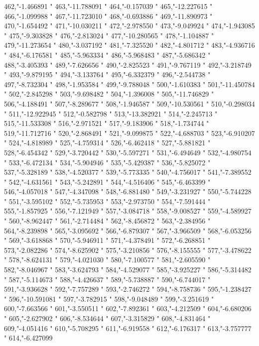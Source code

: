 462,"-1.466891
"
463,"-11.788091
"
464,"-0.157039
"
465,"-12.227615
"
466,"-1.099988
"
467,"-11.723010
"
468,"-0.693886
"
469,"-11.890973
"
470,"-1.654492
"
471,"-10.030211
"
472,"-2.978550
"
473,"-9.049924
"
474,"-1.943085
"
475,"-9.303828
"
476,"-2.813024
"
477,"-10.280565
"
478,"-1.104887
"
479,"-11.273654
"
480,"-3.037192
"
481,"-7.325520
"
482,"-4.801712
"
483,"-4.936716
"
484,"-6.176581
"
485,"-5.963334
"
486,"-5.968483
"
487,"-5.686342
"
488,"-3.405393
"
489,"-7.626656
"
490,"-2.825523
"
491,"-9.767119
"
492,"-3.218749
"
493,"-9.879195
"
494,"-3.133764
"
495,"-6.332379
"
496,"-2.544738
"
497,"-8.732304
"
498,"-1.953584
"
499,"-9.788048
"
500,"-1.610383
"
501,"-11.450784
"
502,"-2.845298
"
503,"-9.698482
"
504,"-1.396008
"
505,"-11.746829
"
506,"-4.188491
"
507,"-8.289677
"
508,"-1.946587
"
509,"-10.530561
"
510,"-0.298034
"
511,"-12.922945
"
512,"-0.582798
"
513,"-13.382921
"
514,"-2.245713
"
515,"-11.533308
"
516,"-2.971521
"
517,"-9.183906
"
518,"-1.734744
"
519,"-11.712716
"
520,"-2.868491
"
521,"-9.099875
"
522,"-4.688703
"
523,"-6.910207
"
524,"-4.818989
"
525,"-4.759314
"
526,"-6.462418
"
527,"-5.881821
"
528,"-6.454342
"
529,"-3.720442
"
530,"-5.597271
"
531,"-6.494649
"
532,"-4.980754
"
533,"-6.472134
"
534,"-5.904946
"
535,"-5.429387
"
536,"-5.825072
"
537,"-5.328189
"
538,"-4.520377
"
539,"-5.773335
"
540,"-4.756017
"
541,"-7.389552
"
542,"-4.631561
"
543,"-5.242891
"
544,"-4.516406
"
545,"-6.463399
"
546,"-4.057018
"
547,"-4.347098
"
548,"-6.881480
"
549,"-3.231927
"
550,"-5.744228
"
551,"-3.595102
"
552,"-5.735953
"
553,"-2.973750
"
554,"-7.591444
"
555,"-1.857925
"
556,"-7.121949
"
557,"-3.084718
"
558,"-9.008527
"
559,"-4.589927
"
560,"-8.962447
"
561,"-2.714484
"
562,"-8.456872
"
563,"-2.384956
"
564,"-8.239898
"
565,"-3.095692
"
566,"-6.879307
"
567,"-3.966509
"
568,"-6.053256
"
569,"-3.618868
"
570,"-5.946911
"
571,"-4.378491
"
572,"-6.268851
"
573,"-2.082286
"
574,"-8.625902
"
575,"-3.210856
"
576,"-8.155555
"
577,"-3.478622
"
578,"-8.624131
"
579,"-4.021030
"
580,"-7.100577
"
581,"-2.605590
"
582,"-8.046967
"
583,"-3.624793
"
584,"-4.529077
"
585,"-3.925227
"
586,"-5.314482
"
587,"-5.114673
"
588,"-4.426637
"
589,"-5.738887
"
590,"-6.744017
"
591,"-3.936628
"
592,"-7.757289
"
593,"-2.746272
"
594,"-8.758736
"
595,"-1.238427
"
596,"-10.591081
"
597,"-3.782915
"
598,"-9.048489
"
599,"-3.251619
"
600,"-7.663566
"
601,"-3.550511
"
602,"-7.892361
"
603,"-4.212509
"
604,"-6.680206
"
605,"-2.627902
"
606,"-8.534644
"
607,"-3.315829
"
608,"-4.831464
"
609,"-4.051416
"
610,"-5.708295
"
611,"-6.919558
"
612,"-6.176317
"
613,"-3.757777
"
614,"-6.427099

